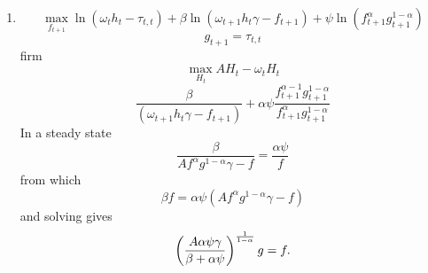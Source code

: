 \documentclass[12pt]{article}
\begin{document}
\begin{enumerate}
\begin{enumerate}
\item 
\begin{equation*}
\underset{f_{t+1}}{\max }\ln \left( \omega _{t}h_{t}-\tau _{t,t}\right)
+\beta \ln \left( \omega _{t+1}h_{t}\gamma -f_{t+1}\right) +\psi \ln \left(
f_{t+1}^{\alpha }g_{t+1}^{1-\alpha }\right) 
\end{equation*}%
\begin{equation*}
g_{t+1}=\tau _{t,t}
\end{equation*}%
firm%
\begin{equation*}
\underset{H_{t}}{\max }AH_{t}-\omega _{t}H_{t}
\end{equation*}%
\begin{equation*}
\frac{\beta }{\left( \omega _{t+1}h_{t}\gamma -f_{t+1}\right) }+\alpha \psi 
\frac{f_{t+1}^{\alpha -1}g_{t+1}^{1-\alpha }}{f_{t+1}^{\alpha
}g_{t+1}^{1-\alpha }}
\end{equation*}%
In a steady state%
\begin{equation*}
\frac{\beta }{Af^{\alpha }g^{1-\alpha }\gamma -f}=\frac{\alpha \psi }{f}
\end{equation*}%
from which 
\begin{equation*}
\beta f=\alpha \psi \left( Af^{\alpha }g^{1-\alpha }\gamma -f\right) 
\end{equation*}%
and solving gives%
\begin{equation*}
\left( \frac{A\alpha \psi \gamma }{\beta +\alpha \psi }\right) ^{\frac{1}{%
1-\alpha }}g=f.
\end{equation*}
\end{enumerate}
\end{enumerate}
\end{document}
